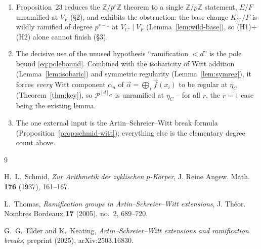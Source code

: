 \documentclass[11pt]{article}
\newcommand{\cP}{\mathcal{P}}
\newcommand{\Z}{\mathbb{Z}}
\theoremstyle{plain}
\theoremstyle{definition}
\begin{document}
\begin{enumerate}[label=(\arabic*)]
\item Proposition~23 reduces the $\Z/p^r\Z$ theorem to a single $\Z/p\Z$ statement,
      $E/F$ unramified at $V_F$ (\S2), and exhibits the obstruction: the base change $K_{C'}/F$ is
      wildly ramified of degree $p^{r-1}$ at $V_{C'}\mid V_F$ (Lemma~\ref{lem:wild-base}), so
      (H1)$+$(H2) alone cannot finish (\S3).
\item The decisive use of the unused hypothesis ``ramification $<d$'' is the pole bound
      \eqref{eq:polebound}. Combined with the isobaricity of Witt addition
      (Lemma~\ref{lem:isobaric}) and symmetric regularity (Lemma~\ref{lem:symreg}), it forces
      \emph{every} Witt component $\alpha_n$ of $\vec\alpha=\bigoplus_i\vec f(x_i)$ to be regular at
      $\eta_C$ (Theorem~\ref{thm:key}), so $\cP^{[d]_G}$ is unramified at $\eta_C$ -- for all $r$,
      the $r=1$ case being the existing lemma.
\item The one external input is the Artin--Schreier--Witt break formula
      (Proposition~\ref{prop:schmid-witt}); everything else is the elementary degree count above.
\end{enumerate}

\begin{thebibliography}{9}

H.~L.~Schmid,
\emph{Zur Arithmetik der zyklischen $p$-K\"orper},
J. Reine Angew. Math. \textbf{176} (1937), 161--167.

L.~Thomas,
\emph{Ramification groups in Artin--Schreier--Witt extensions},
J. Th\'eor. Nombres Bordeaux \textbf{17} (2005), no.~2, 689--720.

G.~G.~Elder and K.~Keating,
\emph{Artin--Schreier--Witt extensions and ramification breaks},
preprint (2025), arXiv:2503.16830.

\end{thebibliography}
\end{document}
